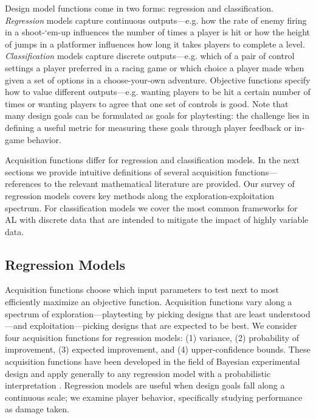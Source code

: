 \documentclass{sig-alternate}
\begin{document}
Design model functions come in two forms: regression and classification.
\textit{Regression} models capture continuous outputs---e.g. how the rate of enemy firing in a shoot-`em-up influences the number of times a player is hit or how the height of jumps in a platformer influences how long it takes players to complete a level.
\textit{Classification} models capture discrete outputs---e.g. which of a pair of control settings a player preferred in a racing game or which choice a player made when given a set of options in a choose-your-own adventure.
Objective functions specify how to value different outputs---e.g. wanting players to be hit a certain number of times or wanting players to agree that one set of controls is good.
Note that many design goals can be formulated as goals for playtesting: the challenge lies in defining a useful metric for measuring these goals through player feedback or in-game behavior.

Acquisition functions differ for regression and classification models.
In the next sections we provide intuitive definitions of several acquisition functions---references to the relevant mathematical literature are provided.
Our survey of regression models covers key methods along the exploration-exploitation spectrum.
For classification models we cover the most common frameworks for AL with discrete data that are intended to mitigate the impact of highly variable data.



\subsection{Regression Models}
Acquisition functions choose which input parameters to test next to most efficiently maximize an objective function.
Acquisition functions vary along a spectrum of exploration---playtesting by picking designs that are least understood---and exploitation---picking designs that are expected to be best.
We consider four acquisition functions for regression models: (1) variance, (2) probability of improvement, (3) expected improvement, and (4) upper-confidence bounds.
These acquisition functions have been developed in the field of Bayesian experimental design and apply generally to any regression model with a probabilistic interpretation \cite{brochu2010:thesis, chaloner1995}.
Regression models are useful when design goals fall along a continuous scale; we examine player behavior, specifically studying performance as damage taken.
\end{document}
